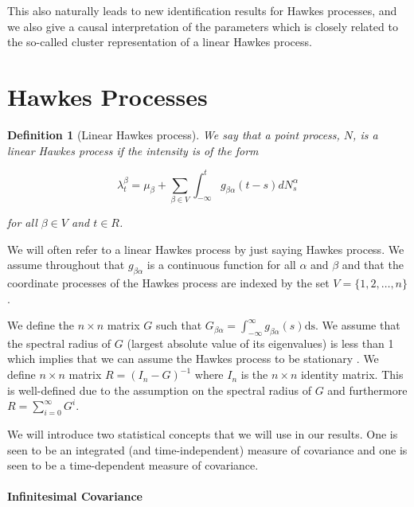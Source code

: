 \documentclass[accepted]{uai2021} %
\newtheorem{defn}[thm]{Definition}
\newcommand{\ds}{\text{ds}}
\begin{document}
This also naturally leads to new identification results for Hawkes processes, 
and we also give a causal interpretation of the parameters which is closely 
related to the so-called cluster representation of a linear Hawkes process.




\section{Hawkes Processes}

\begin{defn}[Linear Hawkes process]
	We say that a point process, $N$, is a \emph{linear Hawkes process} if the 
	intensity is of the form
	
	$$
	\lambda_t^\beta = \mu_\beta + \sum_{\beta \in V} \int_{-\infty}^{t} 
	g_{\beta\alpha}(t - s) d 
	N_s^\alpha
	$$
	
	\noindent for all $\beta\in V$ and $t\in R$. 
	\label{def:hawProc}
\end{defn}

We will often refer to a linear Hawkes process by just saying Hawkes process. 
We assume throughout that $g_{\beta\alpha}$ is a continuous function for all 
$\alpha$ and $\beta$ and that the coordinate processes of the Hawkes 
process are indexed by the set $V = \{1,2,\ldots, n\}$.

We define the $n\times n$ matrix $G$ such that $G_{\beta\alpha} = 
\int_{-\infty}^\infty 
g_{\beta\alpha}(s) \ds$. We assume that the spectral radius of $G$ (largest 
absolute value of its eigenvalues) is less than 1 which implies that we can 
assume the Hawkes process to be stationary \citep{jovanovic2015}.
We define $n\times n$ matrix $R=(I_n - G)^{-1}$ where $I_n$ is the 
$n\times n$ identity matrix. This is well-defined due to the assumption on 
the spectral radius of $G$ and furthermore $R = \sum_{i=0}^\infty G^i$. 

We will introduce two statistical concepts that we will use in our results. One 
is seen to be an integrated (and time-independent) measure of covariance and 
one is seen to be a 
time-dependent measure of covariance.


\paragraph{Infinitesimal Covariance}
\end{document}
